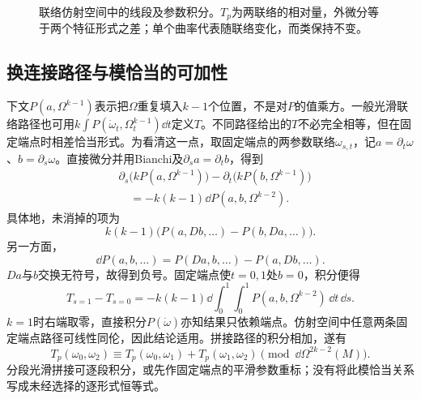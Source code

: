 \begin{figure}[htbp]
\centering
\caption{联络仿射空间中的线段及参数积分。$T_p$为两联络的相对量，外微分等于两个特征形式之差；单个曲率代表随联络变化，而类保持不变。}
\label{fig:connection-transgression}
\end{figure}

\subsection{换连接路径与模恰当的可加性}
下文$P(a,\Omega^{k-1})$表示把$\Omega$重复填入$k-1$个位置，不是对$P$的值乘方。一般光滑联络路径也可用$k\int P(\dot\omega_t,\Omega_t^{k-1})\dd t$定义$T$。不同路径给出的$T$不必完全相等，但在固定端点时相差恰当形式。为看清这一点，取固定端点的两参数联络$\omega_{s,t}$，记$a=\partial_t\omega$、$b=\partial_s\omega$。直接微分并用Bianchi及$\partial_sa=\partial_tb$，得到
\begin{align*}
 &\partial_s\bigl(kP(a,\Omega^{k-1})\bigr)
 -\partial_t\bigl(kP(b,\Omega^{k-1})\bigr)\\
 &\hspace{1em}=-k(k-1)\dd P(a,b,\Omega^{k-2}).
\end{align*}
具体地，未消掉的项为
\[
 k(k-1)\bigl(P(a,D b,\ldots)-P(b,D a,\ldots)\bigr).
\]
另一方面，
\[
 \dd P(a,b,\ldots)=P(Da,b,\ldots)-P(a,Db,\ldots).
\]
$Da$与$b$交换无符号，故得到负号。固定端点使$t=0,1$处$b=0$，积分便得
\[
 T_{s=1}-T_{s=0}
 =-k(k-1)\dd\int_0^1\!\int_0^1P(a,b,\Omega^{k-2})\,\dd t\,\dd s.
\]
$k=1$时右端取零，直接积分$P(\dot\omega)$亦知结果只依赖端点。仿射空间中任意两条固定端点路径可线性同伦，因此结论适用。拼接路径的积分相加，遂有
\[
 T_p(\omega_0,\omega_2)\equiv
 T_p(\omega_0,\omega_1)+T_p(\omega_1,\omega_2)
 \pmod{\dd\Omega^{2k-2}(M)}.
\]
分段光滑拼接可逐段积分，或先作固定端点的平滑参数重标；没有将此模恰当关系写成未经选择的逐形式恒等式。
